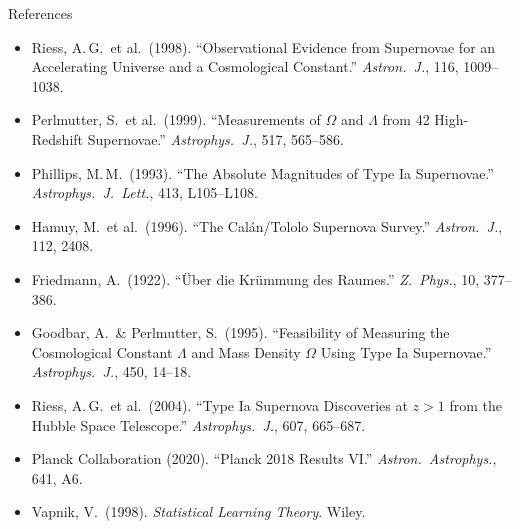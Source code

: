 \documentclass[aspectratio=169]{beamer}
\begin{document}
\begin{frame}{References}

\small
\begin{itemize}
  \item Riess, A.\,G.\ et al.\ (1998). ``Observational Evidence from
    Supernovae for an Accelerating Universe and a Cosmological Constant.''
    \textit{Astron.\ J.}, 116, 1009--1038.
  \item Perlmutter, S.\ et al.\ (1999). ``Measurements of $\Omega$ and
    $\Lambda$ from 42 High-Redshift Supernovae.''
    \textit{Astrophys.\ J.}, 517, 565--586.
  \item Phillips, M.\,M.\ (1993). ``The Absolute Magnitudes of Type Ia
    Supernovae.'' \textit{Astrophys.\ J.\ Lett.}, 413, L105--L108.
  \item Hamuy, M.\ et al.\ (1996). ``The Cal\'an/Tololo Supernova Survey.''
    \textit{Astron.\ J.}, 112, 2408.
  \item Friedmann, A.\ (1922). ``\"Uber die Kr\"ummung des Raumes.''
    \textit{Z.\ Phys.}, 10, 377--386.
  \item Goodbar, A.\ \& Perlmutter, S.\ (1995). ``Feasibility of Measuring
    the Cosmological Constant $\Lambda$ and Mass Density $\Omega$ Using
    Type Ia Supernovae.'' \textit{Astrophys.\ J.}, 450, 14--18.
  \item Riess, A.\,G.\ et al.\ (2004). ``Type Ia Supernova Discoveries
    at $z > 1$ from the Hubble Space Telescope.''
    \textit{Astrophys.\ J.}, 607, 665--687.
  \item Planck Collaboration (2020). ``Planck 2018 Results VI.''
    \textit{Astron.\ Astrophys.}, 641, A6.
  \item Vapnik, V.\ (1998). \textit{Statistical Learning Theory}. Wiley.
\end{itemize}

\end{frame}

\end{document}
